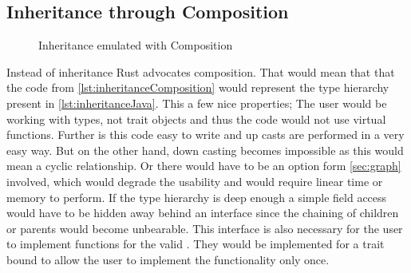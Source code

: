 \documentclass[thesis]{subfiles}
\begin{document}
  \subsection{Inheritance through Composition}%
    \newsavebox{\inheritanceComposition}%
    \begin{lrbox}{\inheritanceComposition}%
      \begin{minipage}{.25\linewidth}%
      \end{minipage}%
    \end{lrbox}%
    \begin{wrapfigure}{r}{0.38\textwidth}%
      \vspace*{-\baselineskip}%
      \captionsetup{type=lstlisting}%
      \begin{center}%
        \usebox{\inheritanceComposition}%
      \end{center}%
      \vspace*{-\baselineskip}%
      \caption{Inheritance emulated with Composition}\label{lst:inheritanceComposition}%
    \end{wrapfigure}%
    Instead of inheritance Rust advocates composition.
    That would mean that that the code from \autoref{lst:inheritanceComposition} would represent the type hierarchy present in \autoref{lst:inheritanceJava}.
    This a few nice properties;
    The user would be working with types, not trait objects and thus the code would not use virtual functions.
    Further is this code easy to write and up casts are performed in a very easy way.
    But on the other hand, down casting becomes impossible as this would mean a cyclic relationship.
    Or there would have to be an option form \autoref{sec:graph} involved, which would degrade the usability and would require linear time or memory to perform.
    If the type hierarchy is deep enough a simple field access would have to be hidden away behind an interface since the chaining of children or parents would become unbearable.
    This interface is also necessary for the user to implement functions for the valid \structs.
    They would be implemented for a trait bound to allow the user to implement the functionality only once.
\end{document}
